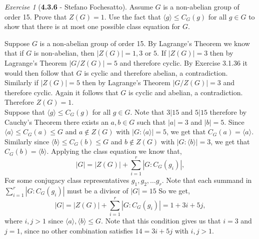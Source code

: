 \documentclass[12pt]{amsart}
\makeatletter
\theoremstyle{remark}
\newtheorem*{exercise}{Exercise}%
\renewenvironment{proof}[1][\proofname]{\par\doublespacing
  \pushQED{\qed}%
  \normalfont \topsep6\p@\@plus6\p@\relax
  \list{}{%
    \settowidth{\leftmargin}{\itshape\proofname:\hskip\labelsep}%
    \setlength{\labelwidth}{0pt}%
    \setlength{\itemindent}{-\leftmargin}%
  }%
  \item[\hskip\labelsep\itshape#1\@addpunct{:}]\ignorespaces
}{%
  \popQED\endlist\@endpefalse
  \singlespacing
}
\theoremstyle{mycomment}
\makeatother
\begin{document}
\begin{exercise}[\textbf{4.3.6} - Stefano Fochesatto] Assume $G$ is a non-abelian group of order 15. Prove that $Z(G) = 1$. Use the fact that $\langle g \rangle \leq C_G(g)$ for all $g \in G$ to show that there is at most one possible class equation for $G$. 
  \begin{proof} Suppose $G$ is a non-abelian group of order 15. By Lagrange's Theorem we know that
    if $G$ is non-abelian, then $|Z(G)| = 1, 3 \text{ or }5$. If $|Z(G)| = 3$ then by Lagrange's Theorem $|G/Z(G)| = 5$ and therefore cyclic. By Exercise 3.1.36 it would then follow that $G$ is cyclic and therefore abelian, a contradiction. Similarly if $|Z(G)| = 5$ then by Lagrange's Theorem $|G/Z(G)| = 3$ and therefore cyclic. Again it follows that $G$ is cyclic and abelian, a contradiction. Therefore $Z(G) = 1$.\\

    Suppose that $\langle g \rangle \leq C_G(g)$ for all $g \in G$. Note that $3|15$ and $5|15$ therefore by Cauchy's Theorem there exists an $a, b \in G$ such that $|a| = 3$ and $|b| = 5$.
    Since $\langle a \rangle \leq C_G(a) \leq G$ and $a \not\in Z(G)$ with $|G : \langle a \rangle| = 5$, we get that $C_G(a) = \langle a \rangle$. Similarly since $\langle b \rangle \leq C_G(b) \leq G$ and $b \not\in Z(G)$ with $|G : \langle b \rangle| = 3$, we get that $C_G(b) = \langle b \rangle$. Applying the class equation we know that,
      \begin{equation*}
      |G| = |Z(G)| + \sum_{i = 1}^r|G:C_G(g_i)|,
    \end{equation*}
    For some conjugacy class representatives $g_1, g_2, \dots g_r$.
    Note that each summand in $\sum_{i = 1}^{r}|G:C_G(g_i)|$ must be a divisor of $|G| = 15$
    So we get, 
    \begin{equation*}
      |G| = |Z(G)| + \sum_{i = 1}^r|G:C_G(g_i)| = 1 + 3i + 5j, 
    \end{equation*}
    where $i, j > 1$ since $\langle a \rangle, \langle b \rangle \leq G$.
    Note that this condition gives us that $i = 3$ and $j = 1$, since no other 
    combination satisfies $14 = 3i + 5j$ with $i, j > 1$. 
  \end{proof}
\end{exercise}
\vspace{.15in}








  
\end{document}
